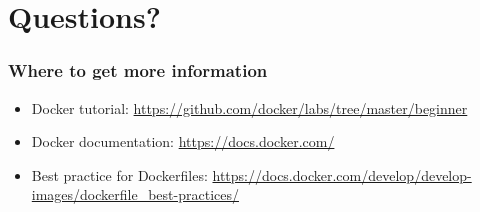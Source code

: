 \documentclass[aspectratio=169,11pt,hyperref={colorlinks=true}]{beamer}
\begin{document}
\section{Questions?}
\begin{frame}
\frametitle{Where to get more information}
    \begin{itemize}
        \item Docker tutorial: \href{https://github.com/docker/labs/tree/master/beginner}{https://github.com/docker/labs/tree/master/beginner}
        \item Docker documentation: \href{https://docs.docker.com/}{https://docs.docker.com/}
        \item Best practice for Dockerfiles: \href{https://docs.docker.com/develop/develop-images/dockerfile\_best-practices/}{https://docs.docker.com/develop/develop-images/dockerfile\_best-practices/}
    \end{itemize}
\end{frame}
\end{document}
